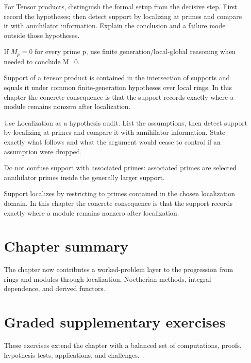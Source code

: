 \begin{exercise}\label{exr:v16-07}
For Tensor products, distinguish the formal setup from the decisive step. First record the hypotheses; then detect support by localizing at primes and compare it with annihilator information. Explain the conclusion and a failure mode outside those hypotheses.
\end{exercise}
\begin{hint}
If \(M_p=0\) for every prime p, use finite generation/local-global reasoning when needed to conclude M=0.
\end{hint}
\begin{solution}
Support of a tensor product is contained in the intersection of supports and equals it under common finite-generation hypotheses over local rings. In this chapter the concrete consequence is that the support records exactly where a module remains nonzero after localization.
\end{solution}

\begin{exercise}\label{exr:v16-08}
Use Localization as a hypothesis audit. List the assumptions, then detect support by localizing at primes and compare it with annihilator information. State exactly what follows and what the argument would cease to control if an assumption were dropped.
\end{exercise}
\begin{hint}
Do not confuse support with associated primes: associated primes are selected annihilator primes inside the generally larger support.
\end{hint}
\begin{solution}
Support localizes by restricting to primes contained in the chosen localization domain. In this chapter the concrete consequence is that the support records exactly where a module remains nonzero after localization.
\end{solution}

\section*{Chapter summary}
The chapter now contributes a worked-problem layer to the progression from rings and modules through localization, Noetherian methods, integral dependence, and derived functors.
\section{Graded supplementary exercises}
These exercises extend the chapter with a balanced set of computations, proofs, hypothesis tests, applications, and challenges.

